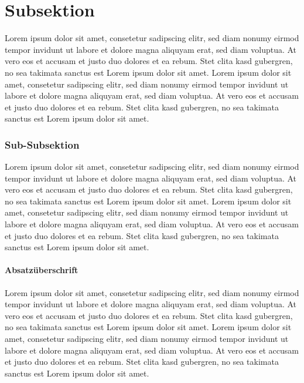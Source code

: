\documentclass{scrreprt}
\begin{document}
\section{Subsektion}
Lorem ipsum dolor sit amet, consetetur sadipscing elitr, sed diam nonumy eirmod tempor invidunt ut labore et dolore magna aliquyam erat, sed diam voluptua. At vero eos et accusam et justo duo dolores et ea rebum. Stet clita kasd gubergren, no sea takimata sanctus est Lorem ipsum dolor sit amet. Lorem ipsum dolor sit amet, consetetur sadipscing elitr, sed diam nonumy eirmod tempor invidunt ut labore et dolore magna aliquyam erat, sed diam voluptua. At vero eos et accusam et justo duo dolores et ea rebum. Stet clita kasd gubergren, no sea takimata sanctus est Lorem ipsum dolor sit amet.
\subsubsection{Sub-Subsektion} 
Lorem ipsum dolor sit amet, consetetur sadipscing elitr, sed diam nonumy eirmod tempor invidunt ut labore et dolore magna aliquyam erat, sed diam voluptua. At vero eos et accusam et justo duo dolores et ea rebum. Stet clita kasd gubergren, no sea takimata sanctus est Lorem ipsum dolor sit amet. Lorem ipsum dolor sit amet, consetetur sadipscing elitr, sed diam nonumy eirmod tempor invidunt ut labore et dolore magna aliquyam erat, sed diam voluptua. At vero eos et accusam et justo duo dolores et ea rebum. Stet clita kasd gubergren, no sea takimata sanctus est Lorem ipsum dolor sit amet.
\paragraph{Absatzüberschrift}
Lorem ipsum dolor sit amet, consetetur sadipscing elitr, sed diam nonumy eirmod tempor invidunt ut labore et dolore magna aliquyam erat, sed diam voluptua. At vero eos et accusam et justo duo dolores et ea rebum. Stet clita kasd gubergren, no sea takimata sanctus est Lorem ipsum dolor sit amet. Lorem ipsum dolor sit amet, consetetur sadipscing elitr, sed diam nonumy eirmod tempor invidunt ut labore et dolore magna aliquyam erat, sed diam voluptua. At vero eos et accusam et justo duo dolores et ea rebum. Stet clita kasd gubergren, no sea takimata sanctus est Lorem ipsum dolor sit amet.


\end{document}
